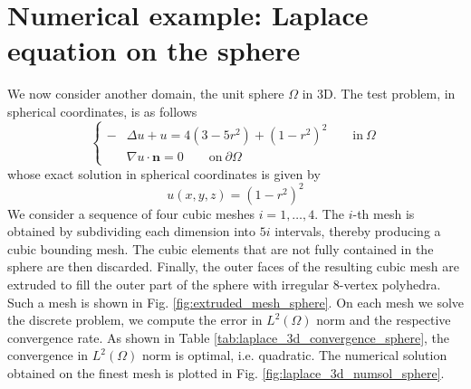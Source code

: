 \documentclass[a4paper]{article}
\begin{document}
 
\section{Numerical example: Laplace equation on the sphere}
We now consider another domain, the unit sphere $\Omega$ in 3D. The test problem, in spherical coordinates, is as follows
\begin{equation}
\label{experiment_laplace_equation_3d_sphere}
\begin{cases}
-&\Delta u + u = 4(3-5r^2) + (1-r^2)^2 \qquad \text{in}\ \Omega\\
&\nabla u \cdot \boldsymbol{n} = 0 \qquad \text{on}\ \partial \Omega
\end{cases}
\end{equation}
whose exact solution in spherical coordinates is given by
\begin{equation}
u(x,y,z) = (1-r^2)^2
\end{equation}
We consider a sequence of four cubic meshes $i=1,\dots,4$. The $i$-th mesh is obtained by subdividing each dimension into $5i$ intervals, thereby producing a cubic bounding mesh.  The cubic elements that are not fully contained in the sphere are then discarded. Finally, the outer faces of the resulting cubic mesh are extruded to fill the outer part of the sphere with irregular $8$-vertex polyhedra.  Such a mesh is shown in Fig.  \ref{fig:extruded_mesh_sphere}. On each mesh we solve the discrete problem,  we compute the error in $L^2(\Omega)$ norm and the respective convergence rate. As shown in Table \ref{tab:laplace_3d_convergence_sphere}, the convergence in $L^2(\Omega)$ norm is optimal, i.e. quadratic. The numerical solution obtained on the finest mesh is plotted in Fig.  \ref{fig:laplace_3d_numsol_sphere}.
\end{document}
